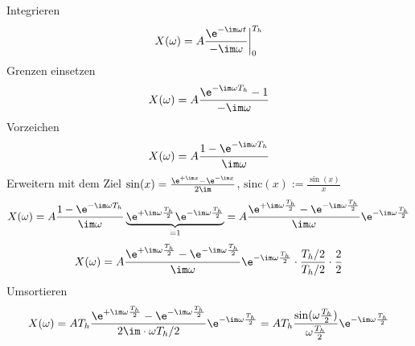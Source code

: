 \begin{ExCalc}
Integrieren
\begin{equation}
X(\omega) = A \frac{\e^{-\im \omega t}}{-\im \omega} \bigg|_{0}^{T_h}
\end{equation}
Grenzen einsetzen
\begin{equation}
X(\omega) = A \frac{\e^{-\im \omega T_h}-1}{-\im \omega}
\end{equation}
Vorzeichen
\begin{equation}
X(\omega) = A \frac{1 - \e^{-\im \omega T_h}}{\im \omega}
\end{equation}
Erweitern mit dem Ziel $\sin(x) = \frac{\e^{+\im x}-\e^{-\im x}}{2\im}$, $\mathrm{sinc}(x):=\frac{\sin(x)}{x}$
\begin{equation}
X(\omega) = A \frac{1 - \e^{-\im \omega T_h}}{\im \omega} \underbrace{\e^{+\im\omega\frac{T_h}{2}} \e^{-\im\omega\frac{T_h}{2}}}_{=1}=
A \frac{\e^{+\im\omega\frac{T_h}{2}} - \e^{-\im\omega\frac{T_h}{2}}}{\im\omega} \e^{-\im\omega\frac{T_h}{2}}
\end{equation}
\begin{equation}
X(\omega) = A \frac{\e^{+\im\omega\frac{T_h}{2}} - \e^{-\im\omega\frac{T_h}{2}}}{\im\omega} \e^{-\im\omega\frac{T_h}{2}}
\cdot \frac{T_h/2}{T_h/2} \cdot \frac{2}{2}
\end{equation}
Umsortieren
\begin{equation}
X(\omega) = A T_h \frac{\e^{+\im\omega\frac{T_h}{2}} - \e^{-\im\omega\frac{T_h}{2}}}{2 \im \cdot \omega T_h/2} \e^{-\im\omega\frac{T_h}{2}} =
A T_h \frac{\sin(\omega\frac{T_h}{2})}{\omega\frac{T_h}{2}} \e^{-\im\omega\frac{T_h}{2}}
\end{equation}
\end{ExCalc}


